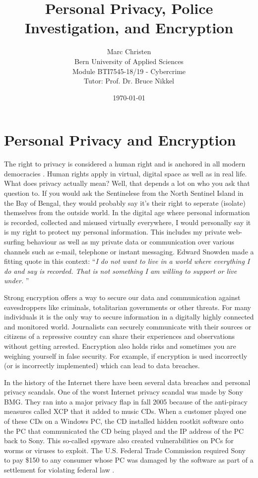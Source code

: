 \documentclass[a4paper, 11pt]{article}
\title{Personal Privacy, Police Investigation, and Encryption}
\author{Marc Christen  \\
	Bern University of Applied Sciences \\
	Module BTI7545-18/19 - Cybercrime \\
	Tutor: Prof. Dr. Bruce Nikkel \\
}
\date{\today}
\begin{document}
\maketitle
\noindent
\section*{Personal Privacy and Encryption}
The right to privacy is considered a human right and is anchored in all modern democracies \cite{ECHR}. Human rights apply in virtual, digital space as well as in real life. What does privacy actually mean? Well, that depends a lot on who you ask that question to. If you would ask the Sentinelese from the North Sentinel Island in the Bay of Bengal, they would probably say it's their right to seperate (isolate) themselves from the outside world. In the digital age where personal information is recorded, collected and misused virtually everywhere, I would personally say it is my right to protect my personal information. This includes my private web-surfing behaviour as well as my private data or communication over various channels such as e-mail, telephone or instant messaging. Edward Snowden made a fitting quote in this context: \enquote{\textit{I do not want to live in a world where everything I do and say is recorded. That is not something I am willing to support or live under.} \cite{SNOWDEN}}  
\par Strong encryption offers a way to secure our data and communication against eavesdroppers like criminals, totalitarian governments or other threats.
For many individuals it is the only way to secure information in a digitally highly connected and monitored world. Journalists can securely communicate with their sources or citizens of a repressive country can share their experiences and observations without getting arrested.
Encryption also holds risks and sometimes you are weighing yourself in false security. For example, if encryption is used incorrectly (or is incorrectly implemented) which can lead to data breaches.
\par In the history of the Internet there have been several data breaches and personal privacy scandals. One of the worst Internet privacy scandal was made by Sony BMG. They ran into a major privacy flap in fall 2005 because of the anti-piracy measures called XCP that it added to music CDs. When a customer played one of these CDs on a Windows PC, the CD installed hidden rootkit software onto the PC that communicated the CD being played and the IP address of the PC back to Sony. This so-called spyware also created vulnerabilities on PCs for worms or viruses to exploit. The U.S. Federal Trade Commission required Sony to pay \$150 to any consumer whose PC was damaged by the software as part of a settlement for violating federal law \cite{SONY}.
\end{document}
